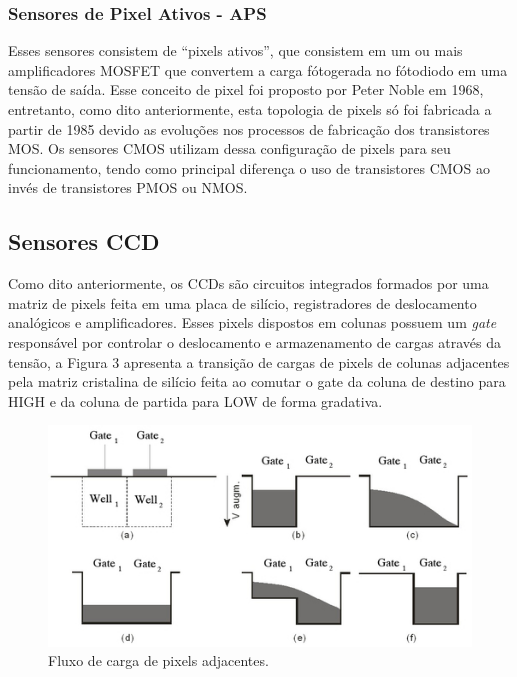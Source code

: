 \documentclass[10pt,a4paper,twocolumn]{article}
\begin{document}
	\subsubsection*{Sensores de Pixel Ativos - APS}
		Esses sensores consistem de ``pixels ativos'', que consistem em um ou mais amplificadores MOSFET que convertem a carga fótogerada no fótodiodo em uma tensão de saída. Esse conceito de pixel foi proposto por Peter Noble em 1968, entretanto, como dito anteriormente, esta topologia de pixels só foi fabricada a partir de 1985 devido as evoluções nos processos de fabricação dos transistores MOS.  Os sensores CMOS utilizam dessa configuração de pixels para seu funcionamento, tendo como principal diferença o uso de transistores CMOS ao invés de transistores PMOS ou NMOS.
	
	\subsection*{Sensores CCD}
	Como dito anteriormente, os CCDs são circuitos integrados formados por uma matriz de pixels feita em uma placa de silício, registradores de deslocamento analógicos e amplificadores. Esses pixels dispostos em colunas possuem um \textit{gate} responsável por controlar o deslocamento e armazenamento de cargas através da tensão, a Figura 3 apresenta a transição de cargas de pixels de colunas adjacentes pela matriz cristalina de silício feita ao comutar o gate da coluna de destino para HIGH e da coluna de partida para LOW de forma gradativa.
	
	\begin{figure}[!h]
		\centering
		\includegraphics[scale=0.45]{imagens/ccd.jpg}
		\caption{Fluxo de carga de pixels adjacentes.}
	\end{figure}
		
\end{document}
